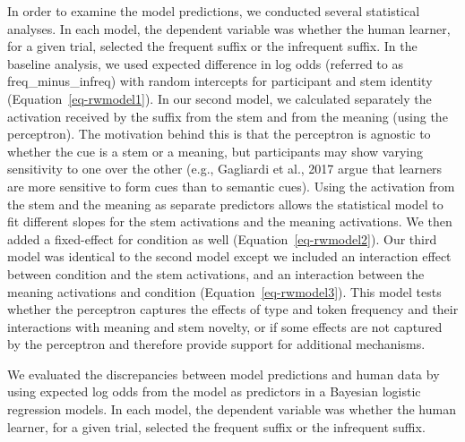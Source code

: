 \documentclass[
  letterpaper,
  DIV=11,
  numbers=noendperiod]{scrartcl}
\begin{document}
In order to examine the model predictions, we conducted several
statistical analyses. In each model, the dependent variable was whether
the human learner, for a given trial, selected the frequent suffix or
the infrequent suffix. In the baseline analysis, we used expected
difference in log odds (referred to as freq\_minus\_infreq) with random
intercepts for participant and stem identity
(Equation~\ref{eq-rwmodel1}). In our second model, we calculated
separately the activation received by the suffix from the stem and from
the meaning (using the perceptron). The motivation behind this is that
the perceptron is agnostic to whether the cue is a stem or a meaning,
but participants may show varying sensitivity to one over the other
(e.g., Gagliardi et al., 2017 argue that learners are more sensitive to
form cues than to semantic cues). Using the activation from the stem and
the meaning as separate predictors allows the statistical model to fit
different slopes for the stem activations and the meaning activations.
We then added a fixed-effect for condition as well
(Equation~\ref{eq-rwmodel2}). Our third model was identical to the
second model except we included an interaction effect between condition
and the stem activations, and an interaction between the meaning
activations and condition (Equation~\ref{eq-rwmodel3}). This model tests
whether the perceptron captures the effects of type and token frequency
and their interactions with meaning and stem novelty, or if some effects
are not captured by the perceptron and therefore provide support for
additional mechanisms.

We evaluated the discrepancies between model predictions and human data
by using expected log odds from the model as predictors in a Bayesian
logistic regression models. In each model, the dependent variable was
whether the human learner, for a given trial, selected the frequent
suffix or the infrequent suffix.
\end{document}
